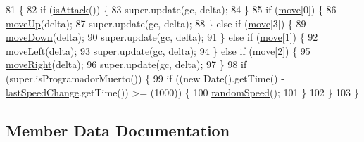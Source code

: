 \begin{DoxyCode}
81                                                      \{
82         \textcolor{keywordflow}{if} (\mbox{\hyperlink{classentities_1_1_subject_a6c4ff8d1e50168c7738c8b39cec72631}{isAttack}}()) \{
83             super.update(gc, delta);
84         \}
85         \textcolor{keywordflow}{if} (\mbox{\hyperlink{classentities_1_1_player_afbadbf8ec5ab49e6cbadb0d39f9ad6d1}{move}}[0]) \{
86             \mbox{\hyperlink{classentities_1_1_animated_sprite_entity_ad55c31998d2dac72b458d5428776fc57}{moveUp}}(delta);
87             super.update(gc, delta);
88         \} \textcolor{keywordflow}{else} \textcolor{keywordflow}{if} (\mbox{\hyperlink{classentities_1_1_player_afbadbf8ec5ab49e6cbadb0d39f9ad6d1}{move}}[3]) \{
89             \mbox{\hyperlink{classentities_1_1_animated_sprite_entity_a818215ee10658afedf17eef3b002d7c1}{moveDown}}(delta);
90             super.update(gc, delta);
91         \} \textcolor{keywordflow}{else} \textcolor{keywordflow}{if} (\mbox{\hyperlink{classentities_1_1_player_afbadbf8ec5ab49e6cbadb0d39f9ad6d1}{move}}[1]) \{
92             \mbox{\hyperlink{classentities_1_1_animated_sprite_entity_a3a0ea9690a4518899e74d92882952c8c}{moveLeft}}(delta);
93             super.update(gc, delta);
94         \} \textcolor{keywordflow}{else} \textcolor{keywordflow}{if} (\mbox{\hyperlink{classentities_1_1_player_afbadbf8ec5ab49e6cbadb0d39f9ad6d1}{move}}[2]) \{
95             \mbox{\hyperlink{classentities_1_1_animated_sprite_entity_a2c5313110fec88112214016c9e5435a7}{moveRight}}(delta);
96             super.update(gc, delta);
97         \}
98         \textcolor{keywordflow}{if} (super.isProgramadorMuerto()) \{
99             \textcolor{keywordflow}{if} ((\textcolor{keyword}{new} Date().getTime() - \mbox{\hyperlink{classentities_1_1_player_aa19245e93679111fca5ca4458fecee53}{lastSpeedChange}}.getTime()) >= (1000)) \{
100                 \mbox{\hyperlink{classentities_1_1_player_a0735d0ed04f027c6c4caa2816771a316}{randomSpeed}}();
101             \}
102         \}
103     \}
\end{DoxyCode}


\subsection{Member Data Documentation}
\mbox{\label{classentities_1_1_player_a5c0c41f4ba8b9647580089c5314cd3a6}} 
